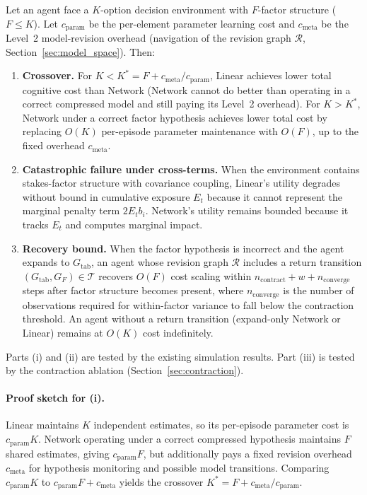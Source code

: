 \begin{proposition}\label{prop:crossover}
Let an agent face a $K$-option decision environment with $F$-factor structure
($F \leq K$).  Let $c_{\mathrm{param}}$ be the per-element parameter learning
cost and $c_{\mathrm{meta}}$ be the Level~2 model-revision overhead (navigation
of the revision graph $\mathcal{R}$, Section~\ref{sec:model_space}).  Then:
\begin{enumerate}[label=(\roman*)]
\item \textbf{Crossover.}
For $K < K^* = F + c_{\mathrm{meta}}/c_{\mathrm{param}}$, Linear achieves lower
total cognitive cost than Network (Network cannot do better than operating in a
correct compressed model and still paying its Level~2 overhead).
For $K > K^*$, Network under a correct factor hypothesis achieves lower total
cost by replacing $O(K)$ per-episode parameter maintenance with $O(F)$, up to the
fixed overhead $c_{\mathrm{meta}}$.

\item \textbf{Catastrophic failure under cross-terms.}
When the environment contains stakes-factor structure with covariance coupling,
Linear's utility degrades without bound in cumulative exposure $E_t$ because it
cannot represent the marginal penalty term $2E_t b_i$.  Network's utility
remains bounded because it tracks $E_t$ and computes marginal impact.

\item \textbf{Recovery bound.}
When the factor hypothesis is incorrect and the agent expands to
$G_{\mathrm{tab}}$, an agent whose revision graph $\mathcal{R}$ includes a
return transition $(G_{\mathrm{tab}}, G_F) \in \mathcal{T}$ recovers $O(F)$ cost
scaling within $n_{\mathrm{contract}} + w + n_{\mathrm{converge}}$ steps after
factor structure becomes present, where $n_{\mathrm{converge}}$ is the number of
observations required for within-factor variance to fall below the contraction
threshold.  An agent without a return transition (expand-only Network or Linear)
remains at $O(K)$ cost indefinitely.
\end{enumerate}

Parts (i) and (ii) are tested by the existing simulation results.
Part (iii) is tested by the contraction ablation
(Section~\ref{sec:contraction}).
\end{proposition}

\paragraph{Proof sketch for (i).}
Linear maintains $K$ independent estimates, so its per-episode parameter cost is
$c_{\mathrm{param}}K$.  Network operating under a correct compressed hypothesis
maintains $F$ shared estimates, giving $c_{\mathrm{param}}F$, but additionally
pays a fixed revision overhead $c_{\mathrm{meta}}$ for hypothesis monitoring and
possible model transitions.  Comparing $c_{\mathrm{param}}K$ to
$c_{\mathrm{param}}F+c_{\mathrm{meta}}$ yields the crossover
$K^* = F + c_{\mathrm{meta}}/c_{\mathrm{param}}$.

